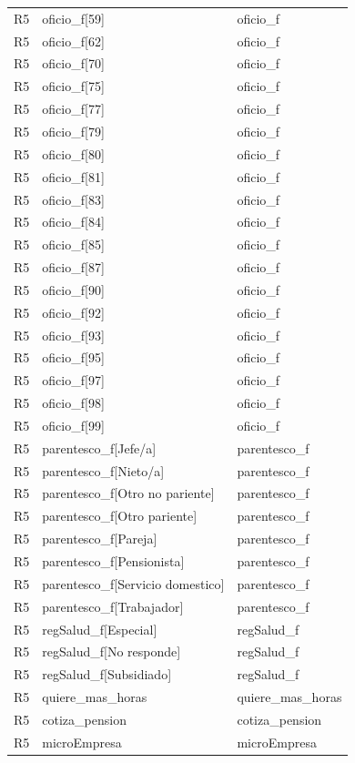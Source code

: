 \begin{longtable}{lll}
R5 & oficio\_f[59] & oficio\_f \\
R5 & oficio\_f[62] & oficio\_f \\
R5 & oficio\_f[70] & oficio\_f \\
R5 & oficio\_f[75] & oficio\_f \\
R5 & oficio\_f[77] & oficio\_f \\
R5 & oficio\_f[79] & oficio\_f \\
R5 & oficio\_f[80] & oficio\_f \\
R5 & oficio\_f[81] & oficio\_f \\
R5 & oficio\_f[83] & oficio\_f \\
R5 & oficio\_f[84] & oficio\_f \\
R5 & oficio\_f[85] & oficio\_f \\
R5 & oficio\_f[87] & oficio\_f \\
R5 & oficio\_f[90] & oficio\_f \\
R5 & oficio\_f[92] & oficio\_f \\
R5 & oficio\_f[93] & oficio\_f \\
R5 & oficio\_f[95] & oficio\_f \\
R5 & oficio\_f[97] & oficio\_f \\
R5 & oficio\_f[98] & oficio\_f \\
R5 & oficio\_f[99] & oficio\_f \\
R5 & parentesco\_f[Jefe/a] & parentesco\_f \\
R5 & parentesco\_f[Nieto/a] & parentesco\_f \\
R5 & parentesco\_f[Otro no pariente] & parentesco\_f \\
R5 & parentesco\_f[Otro pariente] & parentesco\_f \\
R5 & parentesco\_f[Pareja] & parentesco\_f \\
R5 & parentesco\_f[Pensionista] & parentesco\_f \\
R5 & parentesco\_f[Servicio domestico] & parentesco\_f \\
R5 & parentesco\_f[Trabajador] & parentesco\_f \\
R5 & regSalud\_f[Especial] & regSalud\_f \\
R5 & regSalud\_f[No responde] & regSalud\_f \\
R5 & regSalud\_f[Subsidiado] & regSalud\_f \\
R5 & quiere\_mas\_horas & quiere\_mas\_horas \\
R5 & cotiza\_pension & cotiza\_pension \\
R5 & microEmpresa & microEmpresa \\

\end{longtable}
